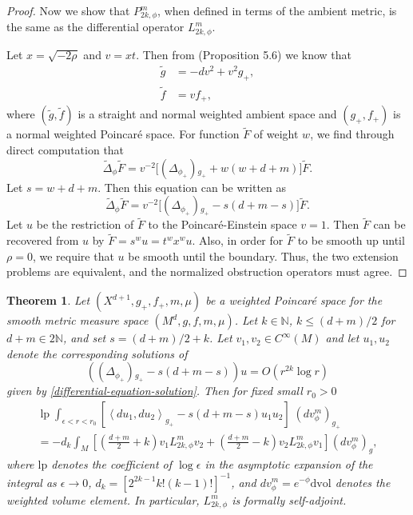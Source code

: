 \documentclass{amsart}
\newtheorem{theorem}{Theorem}[section]
\begin{document}
\begin{proof}
Now we show that $P_{2k,\phi}^m$, when defined in terms of the ambient metric, is the same as the differential operator $L_{2k,\phi}^m$.

Let $x=\sqrt{-2\rho}$ and $v=xt$. Then from {\cites{CaseKhaitan2022} (Proposition 5.6)} we know that 
\begin{equation*}
\begin{aligned}
\widetilde{g}&=-dv^2+v^2 g_+,\\ 
\widetilde{f}&=vf_+,    
\end{aligned}
\end{equation*} where $(\widetilde{g},\widetilde{f})$ is a straight and normal weighted ambient space and $(g_+,f_+)$ is a normal weighted Poincar\'e space. For function $\widetilde{F}$ of weight $w$, we find through direct computation that 
\begin{equation*}
\widetilde{\Delta}_{\phi}\widetilde{F}=v^{-2}\big[(\Delta_{\phi_+}){}_{g_{+}}+w(w+d+m)\big]\widetilde{F}.    
\end{equation*}
Let $s=w+d+m$. Then this equation can be written as 
\begin{equation*}
\widetilde{\Delta}_{\phi}\widetilde{F}=v^{-2}\big[(\Delta_{\phi_+}){}_{g_+}-s(d+m-s)\big]\widetilde{F}.    
\end{equation*}
Let $u$ be the restriction of $\widetilde{F}$ to the Poincar\'e-Einstein space $v=1$. Then $\widetilde{F}$ can be recovered from $u$ by $\widetilde{F}=s^w u=t^w x^w u$. Also, in order for $\widetilde{F}$ to be smooth up until $\rho=0$, we require that $u$ be smooth until the boundary. Thus, the two extension problems are equivalent, and the normalized obstruction operators must agree.
\end{proof}

\begin{theorem}
Let $(X^{d+1},g_+,f_+,m,\mu)$ be a weighted Poincar\'e space for the smooth metric measure space $(M^d,g,f,m,\mu)$. Let $k \in \mathbb{N}$, $k \leq (d+m)/2$ for $d+m\in 2\mathbb{N}$, and set $s=(d+m)/2+k$. Let $v_{1}, v_{2} \in C^{\infty}(M)$ and let $u_{1}, u_{2}$ denote the corresponding solutions of 
$$
\left((\Delta_{\phi_+}){}_{g_+}-s(d+m-s)\right) u=O\left({r^{2k}}\log r\right)
$$
given by \cref{differential-equation-solution}. Then for fixed small {$r_{0}>0$}
\begin{multline}
\label{21}
\operatorname{lp} \int_{\epsilon<{r}<{r_{0}}}\left[\left\langle d u_{1}, d u_{2}\right\rangle_{g_+}-s(d+m-s) u_{1} {u_{2}}\right] \;(d v_\phi^m)_{g_+}\\
=-d_k\int_{M}\left[\left(\frac{d+m}{2}+k\right) v_{1} L_{2k,\phi}^m v_2+\left(\frac{d+m}{2}-k\right)  {v_{2}}L_{2k,\phi}^m v_1\right] (d v_\phi^m)_{g},
\end{multline}
where $\mathrm{lp}$ denotes the coefficient of $\log \epsilon$ in the asymptotic expansion of the integral as $\epsilon \rightarrow 0$, $d_k=[2^{2k-1}k!(k-1)!]^{-1}$, and $d v_\phi^m=e^{-\phi}\mathrm{dvol}$ denotes the weighted volume element. In particular, $L_{2k,\phi}^m$ is formally self-adjoint.
\end{theorem}
\end{document}
